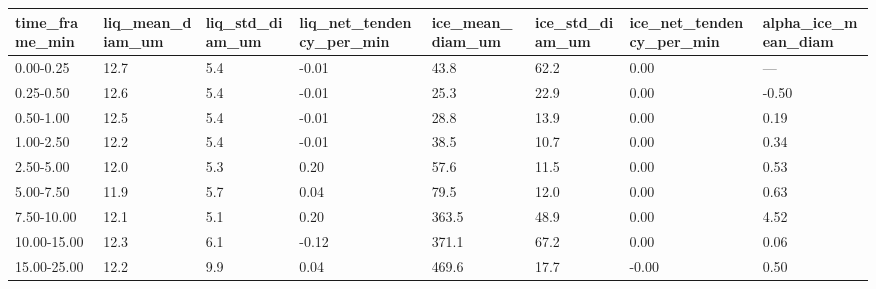 \begin{tabular}{llllllll}
\toprule
time_frame_min & liq_mean_diam_um & liq_std_diam_um & liq_net_tendency_per_min & ice_mean_diam_um & ice_std_diam_um & ice_net_tendency_per_min & alpha_ice_mean_diam \\
\midrule
0.00-0.25 & 12.7 & 5.4 & -0.01 & 43.8 & 62.2 & 0.00 & — \\
0.25-0.50 & 12.6 & 5.4 & -0.01 & 25.3 & 22.9 & 0.00 & -0.50 \\
0.50-1.00 & 12.5 & 5.4 & -0.01 & 28.8 & 13.9 & 0.00 & 0.19 \\
1.00-2.50 & 12.2 & 5.4 & -0.01 & 38.5 & 10.7 & 0.00 & 0.34 \\
2.50-5.00 & 12.0 & 5.3 & 0.20 & 57.6 & 11.5 & 0.00 & 0.53 \\
5.00-7.50 & 11.9 & 5.7 & 0.04 & 79.5 & 12.0 & 0.00 & 0.63 \\
7.50-10.00 & 12.1 & 5.1 & 0.20 & 363.5 & 48.9 & 0.00 & 4.52 \\
10.00-15.00 & 12.3 & 6.1 & -0.12 & 371.1 & 67.2 & 0.00 & 0.06 \\
15.00-25.00 & 12.2 & 9.9 & 0.04 & 469.6 & 17.7 & -0.00 & 0.50 \\
\bottomrule
\end{tabular}
